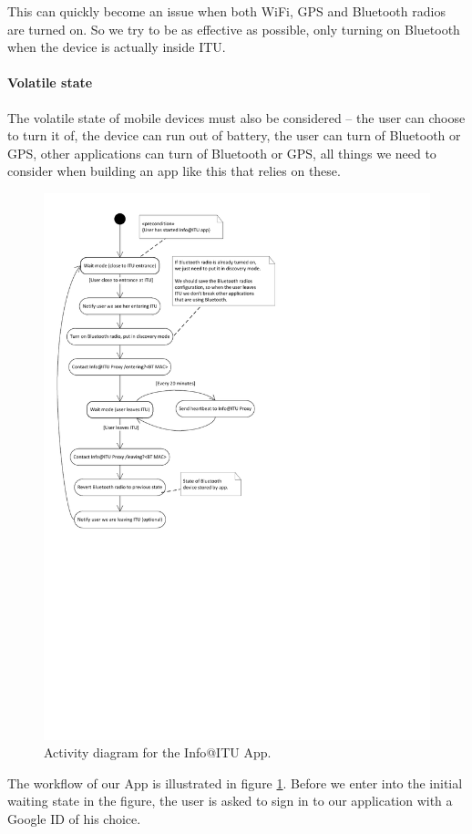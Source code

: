 \documentclass{ubicomp2011}
\begin{document}
This can quickly become an issue when both WiFi, GPS and Bluetooth radios are turned on. So we try to be as effective as possible, only turning on Bluetooth when the device is actually inside ITU.
\paragraph{Volatile state}

The volatile state of mobile devices must also be considered -- the user can choose to turn it of, the device can run out of battery, the user can turn of Bluetooth or GPS, other applications can turn of Bluetooth or GPS, all things we need to consider when building an app like this that relies on these.

\begin{figure}[t]
\begin{center}
\includegraphics[width=0.90\columnwidth]{android-app-activity-diagram.pdf}
\end{center}
\caption{Activity diagram for the Info@ITU App.}
\label{fig:android-app-activity-diagram}
\end{figure}

The workflow of our App is illustrated in figure \ref{fig:android-app-activity-diagram}. Before we enter into the initial waiting state in the figure, the user is asked  to sign in to our application with a Google ID of his choice.
\end{document}
